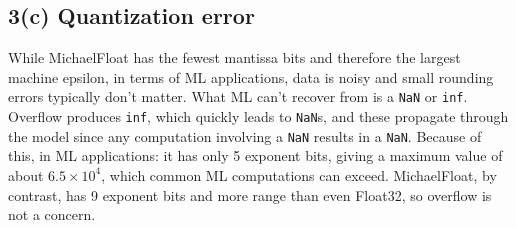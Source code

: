\documentclass[11pt]{article}
\newcommand{\probpart}[1]{\subsection*{#1}}
\begin{document}
\probpart{3(c) Quantization error}



While MichaelFloat has the fewest mantissa bits and therefore the largest machine epsilon, in terms of ML applications, data is noisy and small rounding errors typically don't matter. What ML can't recover from is a \texttt{NaN} or \texttt{inf}. Overflow produces \texttt{inf}, which quickly leads to \texttt{NaN}s, and these propagate through the model since any computation involving a \texttt{NaN} results in a \texttt{NaN}. Because of this,  in ML applications: it has only 5 exponent bits, giving a maximum value of about $6.5 \times 10^4$, which common ML computations can exceed. MichaelFloat, by contrast, has 9 exponent bits and more range than even Float32, so overflow is not a concern.
\end{document}
